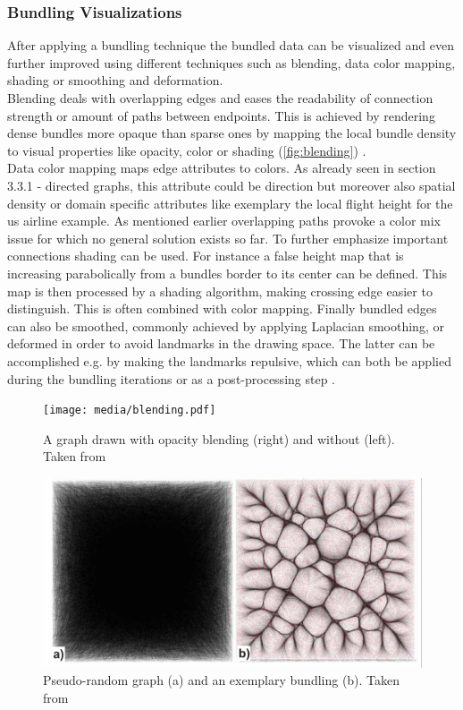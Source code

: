 \subsubsection{Bundling Visualizations}
After applying a bundling technique the bundled data can be visualized and even further improved using different techniques such as blending, data color mapping, shading or smoothing and deformation.\\
Blending deals with overlapping edges and eases the readability of connection strength or amount of paths between endpoints. This is achieved by rendering dense bundles more opaque than sparse ones by mapping the local bundle density to visual properties like opacity, color or shading (\autoref{fig:blending}) \cite{Lhuillier2017}.\\
Data color mapping maps edge attributes to colors. As already seen in section 3.3.1 - directed graphs, this attribute could be direction but moreover also spatial density or domain specific attributes like exemplary the local flight height for the us airline example. As mentioned earlier overlapping paths provoke a color mix issue for which no general solution exists so far.
To further emphasize important connections shading can be used. For instance a false height map that is increasing parabolically from a bundles border to its center can be defined. This map is then processed by a shading algorithm, making crossing edge easier to distinguish. This is often combined with color mapping.
Finally bundled edges can also be smoothed, commonly achieved by applying Laplacian smoothing, or deformed in order to avoid landmarks in the drawing space. The latter can be accomplished e.g. by making the landmarks repulsive, which can both be applied during the bundling iterations or as a post-processing step \cite{Lhuillier2017}.

\begin{figure}
    \centering
    \texttt{[image: media/blending.pdf]}
    \caption{A graph drawn with opacity blending (right) and without (left). Taken from \cite{Lhuillier2017}}
    \label{fig:blending}
\end{figure}
\begin{figure}
    \centering
    \includegraphics[scale=0.8]{media/faithfullness_bundling.pdf}
    \caption{Pseudo-random graph (a) and an exemplary bundling (b). Taken from \cite{Lhuillier2017}}
    \label{fig:faithfulness}
\end{figure}
